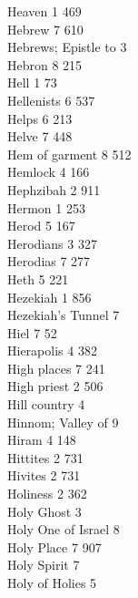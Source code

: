 Heaven \hfill 1 \quad \phantom{0}469\\
Hebrew \hfill 7 \quad \phantom{0}610\\
Hebrews; Epistle to \hfill 3 \\
Hebron \hfill 8 \quad \phantom{0}215\\
Hell \hfill 1 \quad \phantom{0}\phantom{0}73\\
Hellenists \hfill 6 \quad \phantom{0}537\\
Helps \hfill 6 \quad \phantom{0}213\\
Helve \hfill 7 \quad \phantom{0}448\\
Hem of garment \hfill 8 \quad \phantom{0}512\\
Hemlock \hfill 4 \quad \phantom{0}166\\
Hephzibah \hfill 2 \quad \phantom{0}911\\
Hermon \hfill 1 \quad \phantom{0}253\\
Herod \hfill 5 \quad \phantom{0}167\\
Herodians \hfill 3 \quad \phantom{0}327\\
Herodias \hfill 7 \quad \phantom{0}277\\
Heth \hfill 5 \quad \phantom{0}221\\
Hezekiah \hfill 1 \quad \phantom{0}856\\
Hezekiah’s Tunnel \hfill 7 \\
Hiel \hfill 7 \quad \phantom{0}\phantom{0}52\\
Hierapolis \hfill 4 \quad \phantom{0}382\\
High places \hfill 7 \quad \phantom{0}241\\
High priest \hfill 2 \quad \phantom{0}506\\
Hill country \hfill 4 \\
Hinnom; Valley of \hfill 9 \\
Hiram \hfill 4 \quad \phantom{0}148\\
Hittites \hfill 2 \quad \phantom{0}731\\
Hivites \hfill 2 \quad \phantom{0}731\\
Holiness \hfill 2 \quad \phantom{0}362\\
Holy Ghost \hfill 3 \\
Holy One of Israel \hfill 8 \\
Holy Place \hfill 7 \quad \phantom{0}907\\
Holy Spirit \hfill 7 \\
Holy of Holies \hfill 5 \\
